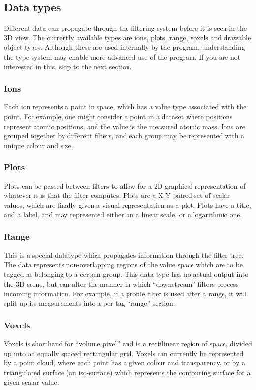 \documentclass[10pt]{article}
\begin{document}
\subsection{Data types}
Different data can propagate through the filtering system before it is seen in the 3D view. The currently available types are ions, plots, range, voxels and drawable object types. Although these are used internally by the program, understanding the type system may enable more advanced use of the program. If you are not interested in this, skip to the next section.  

\subsubsection{Ions}
Each ion represents a point in space, which has a value type associated with the point. For example, one might consider a point in a dataset where positions represent atomic positions, and the value is the measured atomic mass. Ions are grouped together by different filters, and each group may be represented with a unique colour and size.  

\subsubsection{Plots}
Plots can be passed between filters to allow for a 2D graphical representation of whatever it is that the filter computes. Plots are a X-Y paired set of scalar values, which are finally given a visual representation as a plot. Plots have a title, and a label, and may represented either on a linear scale, or a logarithmic one.

\subsubsection{Range}
This is a special datatype which propagates information through the filter tree. The data represents non-overlapping regions of the value space which are to be tagged as belonging to a certain group. This data type has no actual output into the 3D scene, but can alter the manner in which ``downstream'' filters process incoming information. For example, if a profile filter is used after a range, it will split up its measurements into a per-tag ``range'' section. 

\subsubsection{Voxels}
Voxels is shorthand for ``volume pixel'' and is a rectilinear region of space, divided up into an equally spaced rectangular grid. Voxels can currently be represented by a point cloud, where each point has a given colour and transparency, or by a triangulated surface (an iso-surface) which represents the contouring surface for a given scalar value.
\end{document}
